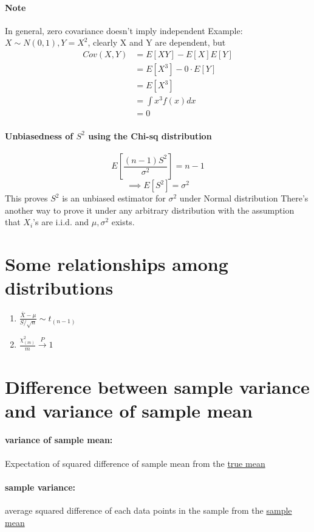 \documentclass[11pt]{article}
\newcommand{\under}[1]{\underline{#1}}
\begin{document}
 \paragraph{Note} In general, zero covariance doesn't imply independent \newline
 Example: $X \sim N(0,1), Y = X^2$, clearly X and Y are dependent, but 
 \begin{align*}
 Cov(X,Y) &= E[XY] - E[X]E[Y] \\
 &=E[X^3]-0\cdot E[Y]\\
 &=E[X^3]\\
 &=\int x^3f(x)dx\\
 &=0 \tag{since $x^3f(x)$ is centro-symmetric}
 \end{align*}
 \paragraph{Unbiasedness of $S^2$ using the Chi-sq distribution}
 $$E[\frac{(n-1)S^2}{\sigma^2}] = n-1$$
 $$\implies E[S^2] = \sigma^2$$
 This proves $S^2$ is an unbiased estimator for $\sigma^2$ under Normal distribution \newline
 There's another way to prove it under any arbitrary distribution with the assumption that $X_i$'s are i.i.d. and $\mu, \sigma^2$ exists.
 \section{Some relationships among distributions}
 \begin{enumerate}
 	\item $\frac{\bar X - \mu}{S/\sqrt{n}} \sim t_{(n-1)}$
 	\item $\frac{\chi^2_{(m)}}{m} \overset{P}{\rightarrow}1$
 \end{enumerate} 
 \section{Difference between sample variance and variance of sample mean}
 \paragraph{variance of sample mean:} Expectation of squared difference of sample mean from the \under{true mean}
 \paragraph{sample variance:} average squared difference of each data points in the sample from the \under{sample mean}
\end{document}
